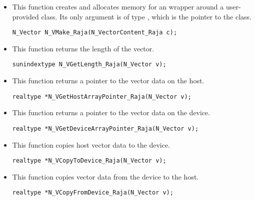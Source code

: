 \begin{itemize}

\item {}

  This function creates and allocates memory for an {\nvecraja}
  wrapper around a user-provided  class.
  Its only argument is of type , which
  is the pointer to the class.

\begin{verbatim}
N_Vector N_VMake_Raja(N_VectorContent_Raja c);
\end{verbatim}



\item {}

 This function returns the length of the vector.

 \verb|sunindextype N_VGetLength_Raja(N_Vector v);|


\item {}

 This function returns a pointer to the vector data on the host.

 \verb|realtype *N_VGetHostArrayPointer_Raja(N_Vector v);|



\item {}

 This function returns a pointer to the vector data on the device.

 \verb|realtype *N_VGetDeviceArrayPointer_Raja(N_Vector v);|



\item {}

 This function copies host vector data to the device.

 \verb|realtype *N_VCopyToDevice_Raja(N_Vector v);|



\item {}

 This function copies vector data from the device to the host.

 \verb|realtype *N_VCopyFromDevice_Raja(N_Vector v);|



\end{itemize}

